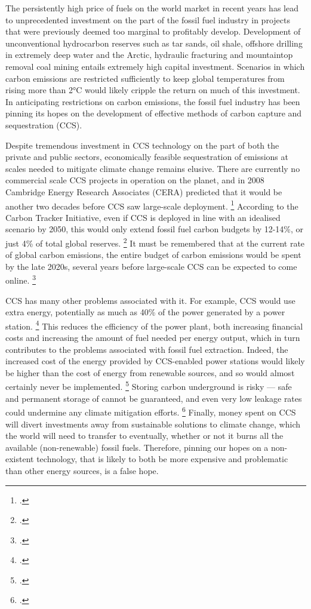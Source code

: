 The persistently high price of fuels on the world market in recent years has lead to unprecedented investment on the part of the fossil fuel industry in projects that were previously deemed too marginal to profitably develop. 
Development of unconventional hydrocarbon reserves such as tar sands, oil shale, offshore drilling in extremely deep water and the Arctic, hydraulic fracturing and mountaintop removal coal mining entails extremely high capital investment. 
Scenarios in which carbon emissions are restricted sufficiently to keep global temperatures from rising more than 2°C would likely cripple the return on much of this investment.
In anticipating restrictions on carbon emissions, the fossil fuel industry has been pinning its hopes on the development of effective methods of carbon capture and sequestration (CCS). 

Despite tremendous investment in CCS technology on the part of both the private and public sectors, economically feasible sequestration of emissions at scales needed to mitigate climate change remains elusive. 
There are currently no commercial scale CCS projects in operation on the planet, and in 2008 Cambridge Energy Research Associates (CERA) predicted that it would be another two decades before CCS saw large-scale deployment. \footcite{CERACrossing}
According to the Carbon Tracker Initiative, even if CCS is deployed in line with an idealised scenario by 2050, this would only extend fossil fuel carbon budgets by 12-14\%, or just 4\% of total global reserves. \footcite{CTI2013}
It must be remembered that at the current rate of global carbon emissions, the entire budget of carbon emissions would be spent by the late 2020s, several years before large-scale CCS can be expected to come online. \footcite{CTI2012}

CCS has many other problems associated with it. For example, CCS would use extra energy, potentially as much as 40\% of the power generated by a power station. \footcite{GPCCS}
This reduces the efficiency of the power plant, both increasing financial costs and increasing the amount of fuel needed per energy output, which in turn contributes to the problems associated with fossil fuel extraction.
Indeed, the increased cost of the energy provided by CCS-enabled power stations would likely be higher than the cost of energy from renewable sources, and so would almost certainly never be implemented. \footcite{SmartPlanetCCS}
Storing carbon underground is risky --- safe and permanent storage of  cannot be guaranteed, and even very low leakage rates could undermine any climate mitigation efforts. \footcite{GPCCS}
Finally, money spent on CCS will divert investments away from sustainable solutions to climate change, which the world will need to transfer to eventually, whether or not it burns all the available (non-renewable) fossil fuels.
Therefore, pinning our hopes on a non-existent technology, that is likely to both be more expensive and problematic than other energy sources, is a false hope.




